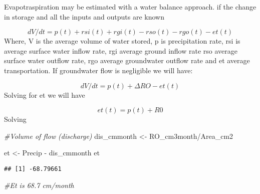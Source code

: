 \documentclass[
]{article}
\newenvironment{Shaded}{\begin{snugshade}}{\end{snugshade}}
\newcommand{\CommentTok}[1]{\textcolor[rgb]{0.56,0.35,0.01}{\textit{#1}}}
\newcommand{\NormalTok}[1]{#1}
\newcommand{\OtherTok}[1]{\textcolor[rgb]{0.56,0.35,0.01}{#1}}
\newcommand{\SpecialCharTok}[1]{\textcolor[rgb]{0.00,0.00,0.00}{#1}}
\begin{document}
Evapotraspiration may be estimated with a water balance approach. if the
change in storage and all the inputs and outputs are known

\[ dV/dt = p(t) + rsi(t) + rgi(t) - rso(t) - rgo(t) - et(t)\] Where, V
is the average volume of water stored, p is precipitation rate, rsi is
average surface water inflow rate, rgi average ground inflow rate rso
average surface water outflow rate, rgo average groundwater outflow rate
and et average transportation. If groundwater flow is negligible we will
have:

\[ dV/dt = p(t) + ΔRO- et(t) \] Solving for et we will have

\[ et(t) = p(t) + R0 \] Solving

\begin{Shaded}
\begin{Highlighting}[]
\CommentTok{\#Volume of flow (discharge) }
\NormalTok{dis\_cmmonth }\OtherTok{\textless{}{-}}\NormalTok{ RO\_cm3month}\SpecialCharTok{/}\NormalTok{Area\_cm2}

\NormalTok{et }\OtherTok{\textless{}{-}}\NormalTok{ Precip }\SpecialCharTok{{-}}\NormalTok{ dis\_cmmonth }
\NormalTok{et }
\end{Highlighting}
\end{Shaded}

\begin{verbatim}
## [1] -68.79661
\end{verbatim}

\begin{Shaded}
\begin{Highlighting}[]
\CommentTok{\#Et is 68.7 cm/month}
\end{Highlighting}
\end{Shaded}
\end{document}
